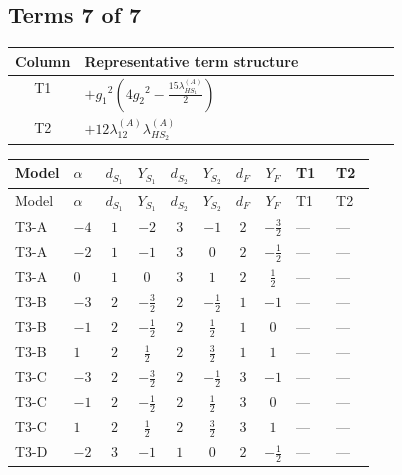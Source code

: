 \documentclass[8pt]{article}
\begin{document}
\begin{landscape}
\subsection*{Terms 7 of 7}
\begin{center}
\begin{tabular}{@{}c >{\raggedright\arraybackslash}p{0.82\linewidth}@{}}
\toprule
Column & Representative term structure \\
\midrule
T1 & \(\displaystyle +{g_1}^2 \left(4 {g_2}^2-\frac{15 {\lambda_{HS_1}^{(A)}}}{2}\right)\) \\
\midrule
T2 & \(\displaystyle +12 {\lambda_{12}^{(A)}} {\lambda_{HS_2}^{(A)}}\) \\
\midrule
\bottomrule
\end{tabular}
\end{center}
\smallskip
\tiny
\begin{longtable}{@{}llcccccc >{\raggedright\arraybackslash}p{0.21\linewidth} >{\raggedright\arraybackslash}p{0.21\linewidth}@{}}
\toprule
Model & $\alpha$ & $d_{S_1}$ & $Y_{S_1}$ & $d_{S_2}$ & $Y_{S_2}$ & $d_F$ & $Y_F$ & T1 & T2 \\
\midrule
\endfirsthead
\toprule
Model & $\alpha$ & $d_{S_1}$ & $Y_{S_1}$ & $d_{S_2}$ & $Y_{S_2}$ & $d_F$ & $Y_F$ & T1 & T2 \\
\midrule
\endhead
T3-A & $-4$ & $1$ & $-2$ & $3$ & $-1$ & $2$ & $-\frac{3}{2}$ & --- & --- \\
\midrule
T3-A & $-2$ & $1$ & $-1$ & $3$ & $0$ & $2$ & $-\frac{1}{2}$ & --- & --- \\
\midrule
T3-A & $0$ & $1$ & $0$ & $3$ & $1$ & $2$ & $\frac{1}{2}$ & --- & --- \\
\midrule
T3-B & $-3$ & $2$ & $-\frac{3}{2}$ & $2$ & $-\frac{1}{2}$ & $1$ & $-1$ & --- & --- \\
\midrule
T3-B & $-1$ & $2$ & $-\frac{1}{2}$ & $2$ & $\frac{1}{2}$ & $1$ & $0$ & --- & --- \\
\midrule
T3-B & $1$ & $2$ & $\frac{1}{2}$ & $2$ & $\frac{3}{2}$ & $1$ & $1$ & --- & --- \\
\midrule
T3-C & $-3$ & $2$ & $-\frac{3}{2}$ & $2$ & $-\frac{1}{2}$ & $3$ & $-1$ & --- & --- \\
\midrule
T3-C & $-1$ & $2$ & $-\frac{1}{2}$ & $2$ & $\frac{1}{2}$ & $3$ & $0$ & --- & --- \\
\midrule
T3-C & $1$ & $2$ & $\frac{1}{2}$ & $2$ & $\frac{3}{2}$ & $3$ & $1$ & --- & --- \\
\midrule
T3-D & $-2$ & $3$ & $-1$ & $1$ & $0$ & $2$ & $-\frac{1}{2}$ & --- & --- \\

\end{longtable}
\end{landscape}
\end{document}
